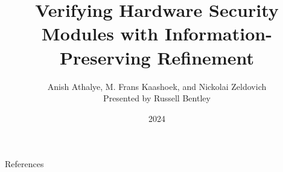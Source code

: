 \documentclass{beamer}
\title{Verifying Hardware Security Modules with Information-Preserving Refinement}
\author{Anish Athalye, M. Frans Kaashoek, and Nickolai Zeldovich\\\vspace{1cm}Presented by Russell Bentley}
\institute{Stony Brook}
\date{2024}
\begin{document}
\frame{\titlepage}













\begin{frame}[allowframebreaks]{References}
    \tiny
    \printbibliography
\end{frame}
\end{document}
